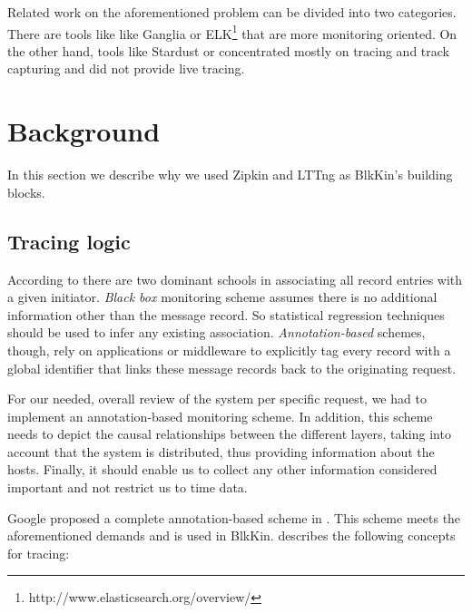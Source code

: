\documentclass[11pt,journal,compsoc]{IEEEtran}
\begin{document}
Related work on the aforementioned problem can be divided into two categories.
There are tools like like Ganglia\cite{ganglia} or
ELK\footnote{http://www.elasticsearch.org/overview/} that are more monitoring
oriented. On the other hand, tools like Stardust\cite{stardust} or \cite{hp}
concentrated mostly on tracing and track capturing and did not provide live
tracing.

\section{Background}
In this section we describe why we used Zipkin and LTTng as BlkKin's building
blocks.

\subsection{Tracing logic}
According to \cite{dapper} there are two dominant schools in associating all
record entries with a given initiator. \emph{Black box} monitoring scheme
assumes there is no additional information other than the message record. So
statistical regression techniques should be used to infer any existing
association. \emph{Annotation-based} schemes, though, rely on applications or
middleware to explicitly tag every record with a global identifier that links
these message records back to the originating request.

For our needed, overall review of the system per specific request, we had to
implement an annotation-based monitoring scheme. In addition, this scheme needs
to depict the causal relationships between the different layers, taking into
account that the system is distributed, thus providing information about the
hosts. Finally, it should enable us to collect any other information considered
important and not restrict us to time data.

Google proposed a complete annotation-based scheme in \cite{dapper}.
This scheme meets the aforementioned demands and is used in
BlkKin. \cite{dapper} describes the following concepts for tracing:
\end{document}
